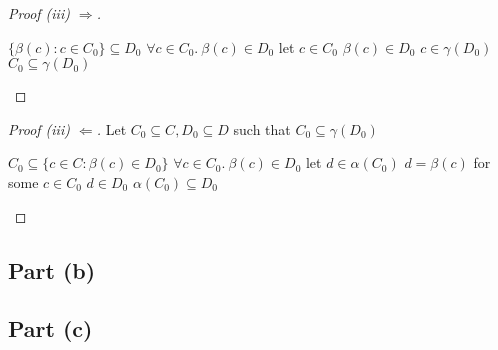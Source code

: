 \begin{prop}
\begin{proof}[Proof (iii) $\Rightarrow$]
    \begin{itemize}
      \step[\imps] $\{\beta(c) : c\in C_0\}\subseteq D_0$
      \step[\imps] $\forall c\in C_0.~\beta(c)\in D_0$
      \marginnote{($\star$)}
      \step let $c\in C_0$
      \step[\imps] $\beta(c)\in D_0$
      \step[\imps] $c\in\gamma(D_0)$
      \step[\imps]$C_0\subseteq\gamma(D_0)$\qedhere
    \end{itemize}
  \end{proof}
  \begin{proof}[Proof (iii) $\Leftarrow$]
    Let $C_0\subseteq C, D_0\subseteq D$ such that $C_0\subseteq\gamma(D_0)$
    \begin{itemize}
      \step[\imps] $C_0\subseteq\{c\in C : \beta(c)\in D_0\}$
      \step[\imps] $\forall c\in C_0.~\beta(c)\in D_0$
      \marginnote{($\star$)}
      \step let $d\in \alpha(C_0)$
      \step[\imps] $d = \beta(c)$ for some $c\in C_0$
      \step[\imps] $d\in D_0$
      \step[\imps]$\alpha(C_0)\subseteq D_0$\qedhere
    \end{itemize}
  \end{proof}
\end{prop}


\subsection{Part (b)}\label{sec:q-2-b}

\subsection{Part (c)}\label{sec:q-2-c}
